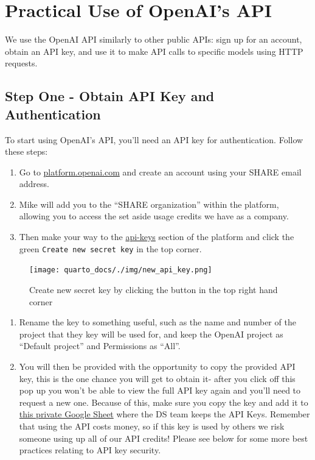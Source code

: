 \documentclass[
  letterpaper,
  DIV=11,
  numbers=noendperiod]{scrreprt}
\begin{document}
\section{Practical Use of OpenAI's
API}\label{practical-use-of-openais-api}

We use the OpenAI API similarly to other public APIs: sign up for an
account, obtain an API key, and use it to make API calls to specific
models using HTTP requests.

\subsection{Step One - Obtain API Key and
Authentication}\label{step-one---obtain-api-key-and-authentication}

To start using OpenAI's API, you'll need an API key for authentication.
Follow these steps:

\begin{enumerate}
\def\labelenumi{\arabic{enumi}.}
\item
  Go to \url{platform.openai.com} and create an account using your SHARE
  email address.
\item
  Mike will add you to the ``SHARE organization'' within the platform,
  allowing you to access the set aside usage credits we have as a
  company.
\item
  Then make your way to the
  \href{https://platform.openai.com/api-keys}{api-keys} section of the
  platform and click the green \texttt{Create\ new\ secret\ key} in the
  top corner.
\end{enumerate}

\begin{figure}[H]

{\centering \texttt{[image: quarto\_docs/./img/new\_api\_key.png]}

}

\caption{Create new secret key by clicking the button in the top right
hand corner}

\end{figure}%

\begin{enumerate}
\def\labelenumi{\arabic{enumi}.}
\setcounter{enumi}{3}
\item
  Rename the key to something useful, such as the name and number of the
  project that they key will be used for, and keep the OpenAI project as
  ``Default project'' and Permissions as ``All''.
\item
  You will then be provided with the opportunity to copy the provided
  API key, this is the one chance you will get to obtain it- after you
  click off this pop up you won't be able to view the full API key again
  and you'll need to request a new one. Because of this, make sure you
  copy the key and add it to
  \href{https://docs.google.com/spreadsheets/d/1thkNcaVC_12MpSRl2LB_nmj1AHZrU_AzrXYwfOfMC7w/edit?usp=sharing}{this
  private Google Sheet} where the DS team keeps the API Keys. Remember
  that using the API costs money, so if this key is used by others we
  risk someone using up all of our API credits! Please see below for
  some more best practices relating to API key security.
\end{enumerate}
\end{document}
